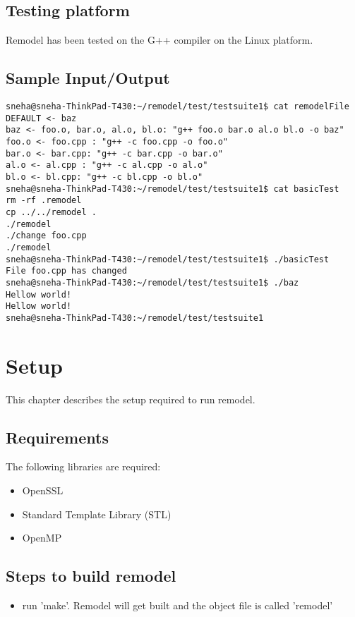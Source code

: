 \documentclass[a4paper, 12pt, notitlepage]{report}
\begin{document}
\section{Testing platform}
Remodel has been tested on the G++ compiler on the Linux platform.

\section{Sample Input/Output}
\begin{verbatim}
sneha@sneha-ThinkPad-T430:~/remodel/test/testsuite1$ cat remodelFile 
DEFAULT <- baz
baz <- foo.o, bar.o, al.o, bl.o: "g++ foo.o bar.o al.o bl.o -o baz"
foo.o <- foo.cpp : "g++ -c foo.cpp -o foo.o"
bar.o <- bar.cpp: "g++ -c bar.cpp -o bar.o"
al.o <- al.cpp : "g++ -c al.cpp -o al.o"
bl.o <- bl.cpp: "g++ -c bl.cpp -o bl.o"
sneha@sneha-ThinkPad-T430:~/remodel/test/testsuite1$ cat basicTest 
rm -rf .remodel
cp ../../remodel .
./remodel
./change foo.cpp
./remodel
sneha@sneha-ThinkPad-T430:~/remodel/test/testsuite1$ ./basicTest 
File foo.cpp has changed
sneha@sneha-ThinkPad-T430:~/remodel/test/testsuite1$ ./baz
Hellow world!
Hellow world!
sneha@sneha-ThinkPad-T430:~/remodel/test/testsuite1 
\end{verbatim}

\chapter{Setup}
%
This chapter describes the setup required to run remodel.
\section{Requirements}
The following libraries are required:
\begin{itemize}
\item OpenSSL
\item Standard Template Library (STL)
\item OpenMP
\end{itemize}

\section{Steps to build remodel}
\begin{itemize}
\item run 'make'. Remodel will get built and the object file is called 'remodel'
\end{itemize}
\end{document}
